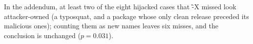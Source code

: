 In the addendum, at least two of the eight hijacked cases that \G-X missed look attacker-owned (a typosquat, and a
package whose only clean release preceded its malicious ones); counting them as new names leaves six misses, and the
conclusion is unchanged ($p = 0.031$).
